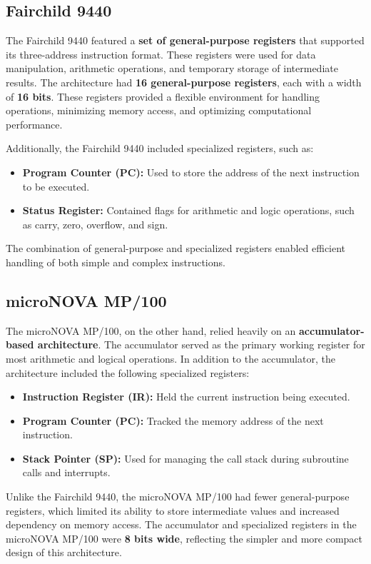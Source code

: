 \documentclass[a4paper,12pt]{article}
\begin{document}
\subsection{Fairchild 9440}

The Fairchild 9440 featured a \textbf{set of general-purpose registers} that supported its three-address instruction format. These registers were used for data manipulation, arithmetic operations, and temporary storage of intermediate results. The architecture had \textbf{16 general-purpose registers}, each with a width of \textbf{16 bits}. These registers provided a flexible environment for handling operations, minimizing memory access, and optimizing computational performance.

Additionally, the Fairchild 9440 included specialized registers, such as:
\begin{itemize}
    \item \textbf{Program Counter (PC):} Used to store the address of the next instruction to be executed.
    \item \textbf{Status Register:} Contained flags for arithmetic and logic operations, such as carry, zero, overflow, and sign.
\end{itemize}

The combination of general-purpose and specialized registers enabled efficient handling of both simple and complex instructions.

\subsection{microNOVA MP/100}

The microNOVA MP/100, on the other hand, relied heavily on an \textbf{accumulator-based architecture}. The accumulator served as the primary working register for most arithmetic and logical operations. In addition to the accumulator, the architecture included the following specialized registers:
\begin{itemize}
    \item \textbf{Instruction Register (IR):} Held the current instruction being executed.
    \item \textbf{Program Counter (PC):} Tracked the memory address of the next instruction.
    \item \textbf{Stack Pointer (SP):} Used for managing the call stack during subroutine calls and interrupts.
\end{itemize}

Unlike the Fairchild 9440, the microNOVA MP/100 had fewer general-purpose registers, which limited its ability to store intermediate values and increased dependency on memory access. The accumulator and specialized registers in the microNOVA MP/100 were \textbf{8 bits wide}, reflecting the simpler and more compact design of this architecture.
\end{document}
